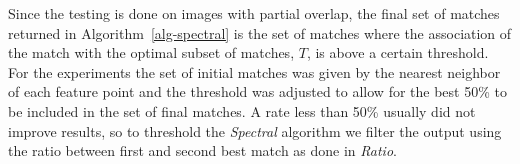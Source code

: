Since the testing is done on images with partial overlap, the final set 
of matches returned in Algorithm~\ref{alg-spectral} is the set of 
matches where the association of the match with the optimal subset of 
matches, $T$, is above a certain threshold. For the experiments the set 
of initial matches was given by the nearest neighbor of each feature 
point and the threshold was adjusted to allow for the best 50\% to be 
included in the set of final matches. A rate less than 50\% usually did 
not improve results, so to threshold the \emph{Spectral}
algorithm we filter the output using the ratio between first and second
best match as done in \emph{Ratio}.
